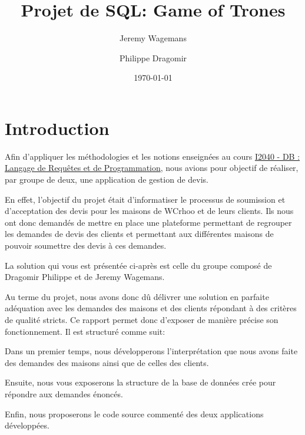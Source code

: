 \documentclass[11pt,a4paper]{report}
\title{Projet de SQL: Game of Trones}
\author{Jeremy Wagemans \and Philippe Dragomir}
\date{\today}
\begin{document}

\maketitle

\tableofcontents

\begingroup
\setlength{\parskip}{\baselineskip}
\chapter{Introduction}


\begin{flushleft}
Afin d’appliquer les méthodologies et les notions enseignées au cours \href{http://ecampus.ipl.be/claroline/course/index.php?cid=2BIN_SQL}{I2040 - DB : Langage de Requêtes et de Programmation}, nous avions pour objectif de réaliser, par groupe de deux, une application de gestion de devis.
\par
En effet, l'objectif du projet était d'informatiser le processus de soumission et d'acceptation des devis pour les maisons de WCrhoo et de leurs clients. Ils nous ont donc demandés de mettre en place une plateforme permettant de regrouper les demandes de devis des clients et permettant aux différentes maisons de pouvoir soumettre des devis à ces demandes.
\par
La solution qui vous est présentée ci-après est celle du groupe composé de Dragomir Philippe et de Jeremy Wagemans.
\par
Au terme du projet, nous avons donc dû délivrer une solution en parfaite adéquation avec les demandes des maisons et des clients répondant à des critères de qualité stricts. Ce rapport permet donc d’exposer de manière précise son fonctionnement. Il est structuré comme suit:
\par
Dans un premier temps, nous développerons l'interprétation que nous avons faite des demandes des maisons ainsi que de celles des clients.
\par
Ensuite, nous vous exposerons la structure de la base de données crée pour répondre aux demandes énoncés.
\par
Enfin, nous proposerons le code source commenté des deux applications développées.
\end{flushleft}
\end{document}
